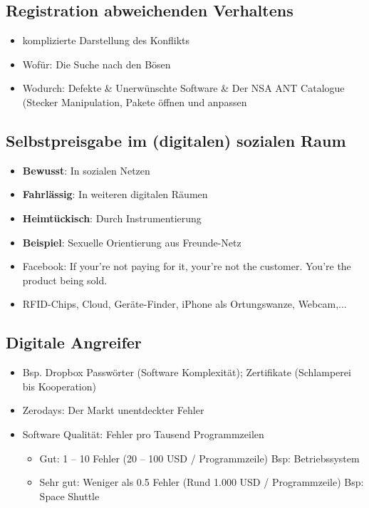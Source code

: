\documentclass{article} %
\begin{document}
		\subsection{Registration abweichenden Verhaltens}
	\begin{itemize}
		\item komplizierte Darstellung des Konflikts
		\item Wofür: Die Suche nach den Bösen
		\item Wodurch: Defekte \& Unerwünschte Software \& Der NSA ANT Catalogue\\
		(Stecker Manipulation, Pakete öffnen und anpassen
	\end{itemize} 
		\subsection{Selbstpreisgabe im (digitalen) sozialen Raum}	
	\begin{itemize}			\item \textbf{Bewusst}: In sozialen Netzen
		\item \textbf{Fahrlässig}: In weiteren digitalen Räumen
		\item \textbf{Heimtückisch}: Durch Instrumentierung
		\item \textbf{Beispiel}: Sexuelle Orientierung aus Freunde-Netz
		\item Facebook: \glqq If your're not paying for it, your're not the customer. You're the product being sold.\grqq
		\item RFID-Chips, Cloud, Geräte-Finder, iPhone als Ortungswanze, Webcam,...
			
	\end{itemize}
		\subsection{Digitale Angreifer}
	\begin{itemize}
			\item Bsp. Dropbox Passwörter (Software Komplexität); Zertifikate (Schlamperei bis Kooperation)
			\item Zerodays: Der Markt unentdeckter Fehler
			\item Software Qualität: Fehler pro Tausend Programmzeilen
			\begin{itemize}
				\item Gut: 1 – 10 Fehler (20 – 100 USD / Programmzeile) Bsp: Betriebssystem
				\item Sehr gut: Weniger als 0.5 Fehler (Rund 1.000 USD / Programmzeile) Bsp: Space Shuttle				
			\end{itemize}
	\end{itemize}
\end{document}
